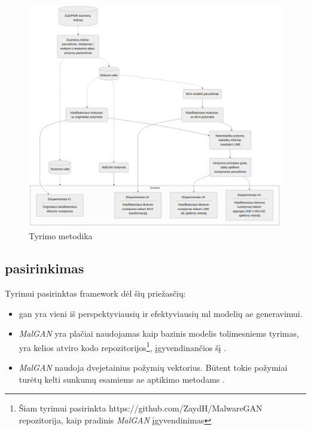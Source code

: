 \begin{figure}[h]
    \centering
    \includegraphics[width=\textwidth]{images/methodology.png}
    \caption{Tyrimo metodika}
    \label{fig:methodology}
\end{figure}

\subsection{  pasirinkimas}

Tyrimui pasirinktas  \gls{framework} dėl šių priežasčių:
\begin{itemize}
    \item \gls{gan} yra vieni iš perspektyviausių ir efektyviausių \gls{ml} modelių \gls{ae} generavimui.
    \item \textit{MalGAN} yra plačiai naudojamas kaip bazinis modelis tolimesniems tyrimas, yra kelios atviro kodo repozitorijos\footnote{Šiam tyrimui pasirinkta https://github.com/ZaydH/MalwareGAN repozitorija, kaip pradinis \textit{MalGAN} įgyvendinimas}, įgyvendinančios šį .
    \item \textit{MalGAN} naudoja dvejetainius požymių vektorius. Būtent tokie požymiai turėtų kelti sunkumų esamiems \gls{ae} aptikimo metodams .
\end{itemize}

\clearpage
